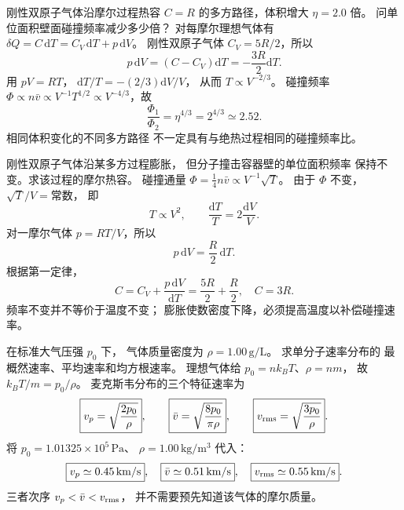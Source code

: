 刚性双原子气体沿摩尔过程热容
$C=R$ 的多方路径，体积增大
$\eta=2.0$ 倍。
问单位面积壁面碰撞频率减少多少倍？
\exsolution
对每摩尔理想气体有
$\delta Q=C\,\mathrm dT=
C_V\,\mathrm dT+p\,\mathrm dV$。
刚性双原子气体
$C_V=5R/2$，所以
\[
p\,\mathrm dV=(C-C_V)\mathrm dT
=-\frac{3R}{2}\mathrm dT.
\]
用 $pV=RT$，
$\mathrm dT/T=-(2/3)\mathrm dV/V$，
从而 $T\propto V^{-2/3}$。
碰撞频率
$\Phi\propto n\bar v\propto V^{-1}T^{1/2}
\propto V^{-4/3}$，故
\[
\boxed{\frac{\Phi_1}{\Phi_2}
=\eta^{4/3}=2^{4/3}\simeq2.52}.
\]
\excheck 相同体积变化的不同多方路径
不一定具有与绝热过程相同的碰撞频率比。

刚性双原子气体沿某多方过程膨胀，
但分子撞击容器壁的单位面积频率
保持不变。求该过程的摩尔热容。
\exsolution
碰撞通量
$\Phi=\tfrac14n\bar v\propto V^{-1}\sqrt T$。
由于 $\Phi$ 不变，
$\sqrt T/V=\text{常数}$，
即
\[
T\propto V^2,\qquad
\frac{\mathrm dT}{T}
=2\frac{\mathrm dV}{V}.
\]
对一摩尔气体
$p=RT/V$，所以
\[
p\,\mathrm dV=\frac R2\,\mathrm dT.
\]
根据第一定律，
\[
C=C_V+\frac{p\,\mathrm dV}{\mathrm dT}
=\frac{5R}{2}+\frac R2,
\quad
\boxed{C=3R}.
\]
\excheck 频率不变并不等价于温度不变；
膨胀使数密度下降，必须提高温度以补偿碰撞速率。

在标准大气压强 $p_0$ 下，
气体质量密度为
$\rho=1.00\,\mathrm{g/L}$。
求单分子速率分布的
最概然速率、平均速率和均方根速率。
\exsolution
理想气体给
$p_0=nk_BT$、$\rho=nm$，
故
$k_BT/m=p_0/\rho$。
麦克斯韦分布的三个特征速率为
\[
\boxed{v_p=\sqrt{\frac{2p_0}{\rho}}},\qquad
\boxed{\bar v=\sqrt{\frac{8p_0}{\pi\rho}}},\qquad
\boxed{v_{\rm rms}=\sqrt{\frac{3p_0}{\rho}}}.
\]
将
$p_0=1.01325\times10^5\,\mathrm{Pa}$、
$\rho=1.00\,\mathrm{kg/m^3}$ 代入：
\[
\boxed{v_p\simeq0.45\,\mathrm{km/s}},\quad
\boxed{\bar v\simeq0.51\,\mathrm{km/s}},\quad
\boxed{v_{\rm rms}\simeq0.55\,\mathrm{km/s}}.
\]
\excheck 三者次序
$v_p<\bar v<v_{\rm rms}$，
并不需要预先知道该气体的摩尔质量。
